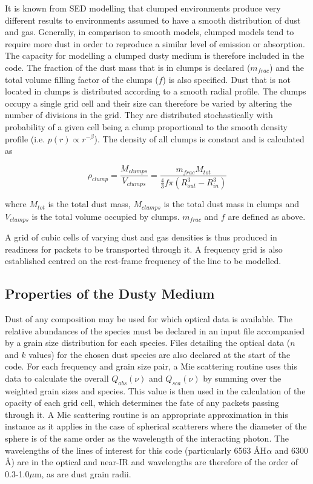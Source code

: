 It is known from SED modelling that clumped environments produce very different results to environments assumed to have a smooth distribution of dust and gas.  Generally, in comparison to smooth models, clumped models tend to require more dust in order to reproduce a similar level of emission or absorption.  The capacity for modelling a clumped dusty medium is therefore included in the code.  The fraction of the dust mass that is in clumps is declared ($m_{frac}$) and the total volume filling factor of the clumps ($f$) is also specified.  Dust that is not located in clumps is distributed according to a smooth radial profile.  The clumps occupy  a single grid cell and their size can therefore be varied by altering the number of divisions in the grid.  They are distributed stochastically with probability of a given cell being a clump proportional to the smooth density profile (i.e. $p(r) \propto r^{-\beta}$).  The density of all clumps is constant and is calculated as 

\begin{equation}
\rho_{clump}=\frac{M_{clumps}}{V_{clumps}}=\frac{m_{frac}M_{tot}}{\frac{4}{3} f\pi (R_{out}^{3}-R_{in}^{3} )}
\end{equation}

\noindent where $M_{tot}$ is the total dust mass, $M_{clumps}$ is the total dust mass in clumps and $V_{clumps}$ is the total volume occupied by clumps.  $m_{frac}$ and $f$ are defined as above.
	
A grid of cubic cells of varying dust and gas densities is thus produced in readiness for packets to be transported through it.  A frequency grid is also established centred on the rest-frame frequency of the line to be modelled.

	
	\subsection{Properties of the Dusty Medium}
	Dust of any composition may be used for which optical data is available.  The relative abundances of the species must be declared in an input file accompanied by a grain size distribution for each species.  Files detailing the optical data ($n$ and $k$ values) for the chosen dust species are also declared at the start of the code.  For each frequency and grain size pair, a Mie scattering routine uses this data to calculate the overall $Q_{abs}(\nu)$ and $Q_{sca}(\nu)$ by summing over the weighted grain sizes and species.  This value is then used in the calculation of the opacity of each grid cell, which determines the fate of any packets passing through it.  A Mie scattering routine is an appropriate approximation in this instance as it applies in the case of spherical scatterers where the diameter of the sphere is of the same order as the wavelength of the interacting photon.  The wavelengths of the lines of interest for this code (particularly 6563 \AA \:H$\alpha$ and 6300 \AA \:[OI])  are in the optical and near-IR  and wavelengths are therefore of the order of 0.3-1.0$\mu$m, as are dust grain radii.
	


